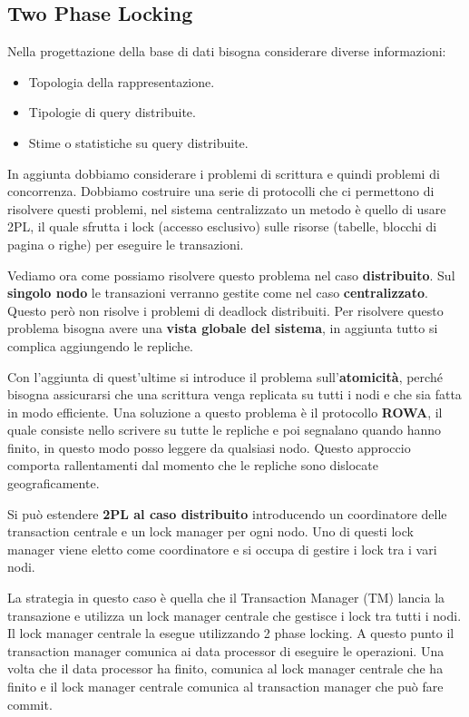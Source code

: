 \subsection{Two Phase Locking}
Nella progettazione della base di dati bisogna considerare diverse informazioni:
\begin{itemize}
      \item Topologia della rappresentazione.
      \item Tipologie di query distribuite.
      \item Stime o statistiche su query distribuite.
\end{itemize}
In aggiunta dobbiamo considerare i problemi di scrittura e quindi problemi di
concorrenza. Dobbiamo costruire una serie di protocolli che ci permettono di
risolvere questi problemi, nel sistema centralizzato un metodo è quello di usare
2PL, il quale sfrutta i lock (accesso esclusivo) sulle risorse (tabelle, blocchi
di pagina o righe) per eseguire le transazioni.

Vediamo ora come possiamo risolvere questo problema nel caso \textbf{distribuito}. Sul
\textbf{singolo nodo} le transazioni verranno gestite come nel caso \textbf{centralizzato}. Questo
però non risolve i problemi di deadlock distribuiti. Per risolvere questo problema
bisogna avere una \textbf{vista globale del sistema}, in aggiunta tutto si complica
aggiungendo le repliche.

Con l'aggiunta di quest'ultime si introduce il problema sull'\textbf{atomicità}, perché
bisogna assicurarsi che una scrittura venga replicata su tutti i nodi e che sia
fatta in modo efficiente. Una soluzione a questo problema è il protocollo \textbf{ROWA},
il quale consiste nello scrivere su tutte le repliche e poi segnalano quando
hanno finito, in questo modo posso leggere da qualsiasi nodo. Questo approccio
comporta rallentamenti dal momento che le repliche sono dislocate geograficamente.

Si può estendere \textbf{2PL al caso distribuito} introducendo un coordinatore delle
transaction centrale e un lock manager per ogni nodo. Uno di questi lock manager
viene eletto come coordinatore e si occupa di gestire i lock tra i vari nodi.

La strategia in questo caso è quella che il Transaction Manager (TM) lancia la
transazione e utilizza un lock manager centrale che gestisce i lock tra tutti i
nodi. Il lock manager centrale la esegue utilizzando 2 phase locking. A questo
punto il transaction manager comunica ai data processor di eseguire le operazioni.
Una volta che il data processor ha finito, comunica al lock manager centrale che
ha finito e il lock manager centrale comunica al transaction manager che può fare
commit.

